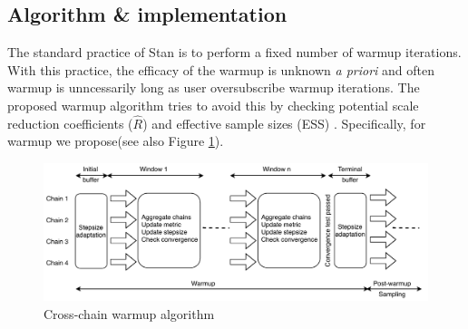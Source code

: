 \documentclass[11pt, reqno, oneside]{amsart}
\begin{document}
\subsection{Algorithm \& implementation}
\label{sec:orgf690079}
The standard practice of Stan is to perform a fixed number of warmup
iterations. With this practice, the efficacy of the warmup is unknown
\emph{a priori} and often warmup is unncessarily long as user oversubscribe warmup iterations.
The proposed warmup algorithm tries to avoid this by checking potential scale reduction
coefficients (\(\hat{R}\)) and effective sample sizes (ESS)
\cite{vehtari_rank-normalization_2019} . Specifically, for warmup we
propose(see also Figure \ref{cc-diagram}).
\begin{figure}[htbp]
\centering
\includegraphics[width=\textwidth]{./figure/cross_chain_diagram.pdf}
\caption{Cross-chain warmup algorithm \label{cc-diagram}}
\end{figure}
\end{document}
